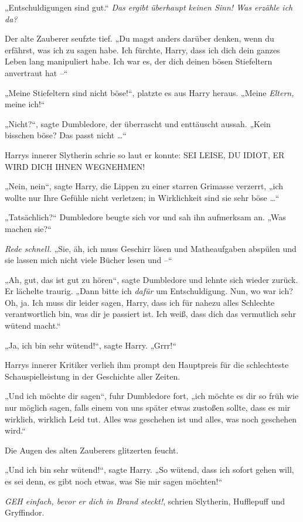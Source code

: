 {„Entschuldigungen sind gut.“ \emph{Das ergibt überhaupt keinen Sinn! Was erzähle ich da?}

Der alte Zauberer seufzte tief. „Du magst anders darüber denken, wenn du erfährst, was ich zu sagen habe. Ich fürchte, Harry, dass ich dich dein ganzes Leben lang manipuliert habe. Ich war es, der dich deinen bösen Stiefeltern anvertraut hat --“

„Meine Stiefeltern sind nicht böse!“, platzte es aus Harry heraus. „Meine \emph{Eltern,} meine ich!“

„Nicht?“, sagte Dumbledore, der überrascht und enttäuscht aussah. „Kein bisschen böse? Das passt nicht …“

Harrys innerer Slytherin schrie so laut er konnte: SEI LEISE, DU IDIOT, ER WIRD DICH IHNEN WEGNEHMEN!

„Nein, nein“, sagte Harry, die Lippen zu einer starren Grimasse verzerrt, „ich wollte nur Ihre Gefühle nicht verletzen; in Wirklichkeit sind sie sehr böse …“

„Tatsächlich?“ Dumbledore beugte sich vor und sah ihn aufmerksam an. „Was machen sie?“

\emph{Rede schnell.} „Sie, äh, ich muss Geschirr lösen und Matheaufgaben abspülen und sie lassen mich nicht viele Bücher lesen und --“

„Ah, gut, das ist gut zu hören“, sagte Dumbledore und lehnte sich wieder zurück. Er lächelte traurig. „Dann bitte ich \emph{dafür} um Entschuldigung. Nun, wo war ich? Oh, ja. Ich muss dir leider sagen, Harry, dass ich für nahezu alles Schlechte verantwortlich bin, was dir je passiert ist. Ich weiß, dass dich das vermutlich sehr wütend macht.“

„Ja, ich bin sehr wütend!“, sagte Harry. „Grrr!“

Harrys innerer Kritiker verlieh ihm prompt den Hauptpreis für die schlechteste Schauspielleistung in der Geschichte aller Zeiten.

„Und ich möchte dir sagen“, fuhr Dumbledore fort, „ich möchte es dir so früh wie nur möglich sagen, falls einem von uns später etwas zustoßen sollte, dass es mir wirklich, wirklich Leid tut. Alles was geschehen ist und alles, was noch geschehen wird.“

Die Augen des alten Zauberers glitzerten feucht.

„Und ich bin sehr wütend!“, sagte Harry. „So wütend, dass ich sofort gehen will, es sei denn, es gibt noch etwas, was Sie mir sagen möchten!“

\emph{GEH einfach, bevor er dich in Brand steckt!}, schrien Slytherin, Hufflepuff und Gryffindor.

}
